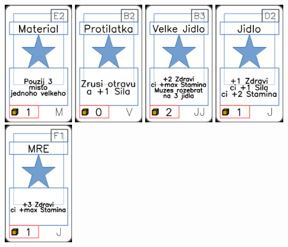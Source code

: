 \documentclass[a4paper]{article}
\begin{document}
	\includegraphics[width=3.0cm]{img-1_51}
	\includegraphics[width=3.0cm]{img-1_66}
	\includegraphics[width=3.0cm]{img-1_37}
	\includegraphics[width=3.0cm]{img-1_16}
	\includegraphics[width=3.0cm]{img-1_25}
\end{document}
